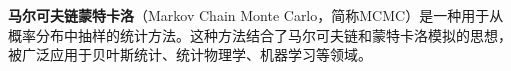 
\textbf{马尔可夫链蒙特卡洛}（Markov Chain Monte Carlo，简称MCMC）是一种用于从概率分布中抽样的统计方法。这种方法结合了马尔可夫链和蒙特卡洛模拟的思想，被广泛应用于贝叶斯统计、统计物理学、机器学习等领域。

